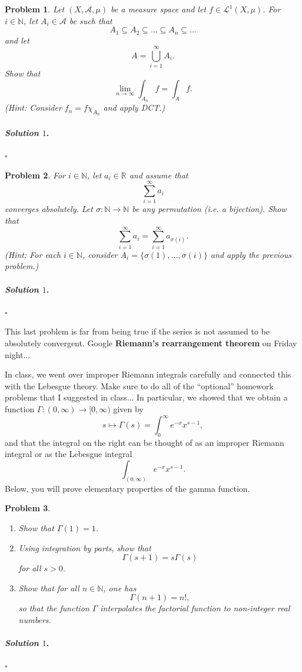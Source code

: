\documentclass[reqno]{amsart}
\theoremstyle{plain}
\newtheorem{problem}{Problem}
\theoremstyle{definition}
\newenvironment{solution1}{\paragraph{\emph{Solution $1$}.}}{\hfill$\square$}
\begin{document}
\begin{problem}
Let $(X,\mathcal{A},\mu)$ be a measure space and let $f \in \mathcal{L}^{1}(X,\mu)$.  For $i \in \mathbb{N}$, let $A_{i} \in \mathcal{A}$ be such that
$$A_{1} \subseteq A_{2} \subseteq \ldots \subseteq A_{n} \subseteq \ldots $$
and let
$$A = \bigcup_{i=1}^{\infty}A_{i}. $$
Show that
$$\lim_{n \to \infty} \int_{A_{n}}f = \int_{A}f. $$
(Hint:  Consider $f_{n} = f \chi_{A_{n}}$ and apply DCT.)
\end{problem}
\begin{solution1}

\end{solution1}



\begin{problem}
For $i \in \mathbb{N}$, let $a_{i} \in \mathbb{R}$ and assume that
$$\sum_{i=1}^{\infty}a_{i} $$
converges absolutely.  Let $\sigma:\mathbb{N} \rightarrow \mathbb{N}$ be any permutation (i.e. a bijection).  Show that
$$\sum_{i=1}^{\infty}a_{i} = \sum_{i=1}^{\infty}a_{\sigma(i)}. $$
(Hint:  For each $i \in \mathbb{N}$, consider $A_{i} = \{ \sigma(1),\ldots,\sigma(i)\}$ and apply the previous problem.)
\end{problem}
\begin{solution1}

\end{solution1}

This last problem is far from being true if the series is not assumed to be absolutely convergent.  Google {\bfseries Riemann's rearrangement theorem} on Friday night...

In class, we went over improper Riemann integrals carefully and connected this with the Lebesgue theory.  Make sure to do all of the ``optional'' homework problems that I suggested in class... In particular, we showed that we obtain a function $\Gamma:(0,\infty) \rightarrow [0,\infty)$ given by
$$s \mapsto \Gamma(s) = \int_{0}^{\infty} e^{-x}x^{s-1}, $$
and that the integral on the right can be thought of as an improper Riemann integral or as the Lebesgue integral
$$\int_{(0,\infty)} e^{-x}x^{s-1}.$$
Below, you will prove elementary properties of the gamma function.

\begin{problem}
\hfill
\begin{enumerate}
\item Show that $\Gamma(1) = 1$.
\item Using integration by parts, show that 
$$\Gamma(s+1) = s\Gamma(s) $$
for all $s > 0$.
\item Show that for all $n \in \mathbb{N}$, one has
$$\Gamma(n+1) = n!, $$
so that the function $\Gamma$ interpolates the factorial function to non-integer real numbers.
\end{enumerate}
\end{problem}
\begin{solution1}

\end{solution1}
\end{document}
